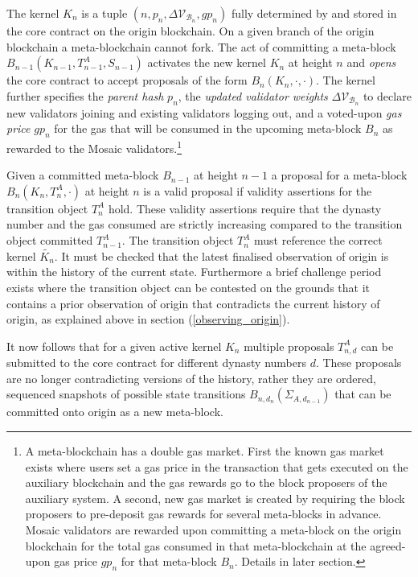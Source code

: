 \documentclass[12pt,a4paper]{article}
\begin{document}
The kernel $K_n$ is a tuple $(n, p_n, \Delta\mathcal{V}_{\mathcal{B}_n}, gp_n)$ fully determined by and stored in the core contract on the origin blockchain.
On a given branch of the origin blockchain a meta-blockchain cannot fork.
The act of committing a meta-block $B_{n-1}(K_{n-1}, T^A_{n-1}, S_{n-1})$ activates the new kernel $K_n$ at height $n$ and \emph{opens} the core contract to accept proposals of the form $B_n(K_n, \cdot, \cdot)$.
The kernel further specifies the \emph{parent hash} $p_n$, the \emph{updated validator weights} $\Delta\mathcal{V}_{\mathcal{B}_n}$ to declare new validators joining and existing validators logging out, and a voted-upon \emph{gas price} $gp_n$ for the gas that will be consumed in the upcoming meta-block $B_n$ as rewarded to the Mosaic validators.\footnote{
	A meta-blockchain has a double gas market.
	First the known gas market exists where users set a gas price in the transaction that gets executed on the auxiliary blockchain and the gas rewards go to the block proposers of the auxiliary system.
	A second, new gas market is created by requiring the block proposers to pre-deposit gas rewards for several meta-blocks in advance.
	Mosaic validators are rewarded upon committing a meta-block on the origin blockchain for the total gas consumed in that meta-blockchain at the agreed-upon gas price $gp_n$ for that meta-block $B_n$. 
	Details in later section.
}

Given a committed meta-block $B_{n-1}$ at height $n-1$ a proposal for a meta-block $B_{n}(K_{n}, T^A_{n}, \cdot)$ at height $n$ is a valid proposal if validity assertions for the transition object $T^A_n$ hold.
These validity assertions require that the dynasty number and the gas consumed are strictly increasing compared to the transition object committed $T^A_{n-1}$.
The transition object $T^A_n$ must reference the correct kernel $\tilde{K_n}$.
It must be checked that the latest finalised observation of origin is within the history of the current state.
Furthermore a brief challenge period exists where the transition object can be contested on the grounds that it contains a prior observation of origin that contradicts the current history of origin, as explained above in section (\ref{observing_origin}).

It now follows that for a given active kernel $K_n$ multiple proposals $T^{A}_{n,d}$ can be submitted to the core contract for different dynasty numbers $d$.
These proposals are no longer contradicting versions of the history, rather they are ordered, sequenced snapshots of possible state transitions $B_{n,d_{n}}(\Sigma_{A,d_{n-1}})$ that can be committed onto origin as a new meta-block.
\end{document}
